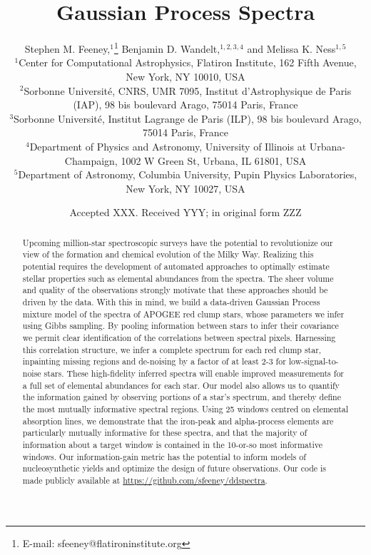 \documentclass[a4paper,fleqn,usenatbib]{mnras}
\title[Gaussian Process Spectra]{Gaussian Process Spectra}
\author[S. M. Feeney et al.]{
Stephen M. Feeney,$^{1}$\thanks{E-mail: sfeeney@flatironinstitute.org}
Benjamin D. Wandelt,$^{1,2,3,4}$
and Melissa K. Ness$^{1,5}$ 
\\
$^{1}$Center for Computational Astrophysics, Flatiron Institute, 162 Fifth Avenue, New York, NY 10010, USA\\
$^{2}$Sorbonne Universit\'e, CNRS, UMR 7095,  Institut d'Astrophysique de Paris (IAP), 98 bis boulevard Arago, 75014 Paris, France\\
$^{3}$Sorbonne Universit\'e, Institut Lagrange de Paris (ILP), 98 bis boulevard Arago, 75014 Paris, France\\
$^{4}$Department of Physics and Astronomy, University of Illinois at Urbana-Champaign, 1002 W Green St, Urbana, IL 61801, USA\\
$^{5}$Department of Astronomy, Columbia University, Pupin Physics Laboratories, New York, NY 10027, USA
}
\date{Accepted XXX. Received YYY; in original form ZZZ}
\begin{document}
\label{firstpage}
\pagerange{\pageref{firstpage}--\pageref{lastpage}}
\maketitle

\begin{abstract}
Upcoming million-star spectroscopic surveys have the potential to revolutionize our view of the formation and chemical evolution of the Milky Way. Realizing this potential requires the development of automated approaches to optimally estimate stellar properties %
such as elemental abundances from the spectra. The sheer volume and quality of the observations strongly motivate that these approaches should be driven by the data. With this in mind, we build a data-driven Gaussian Process mixture model of the spectra of APOGEE red clump stars, whose parameters we infer using Gibbs sampling. By pooling information between stars to infer their covariance we permit clear identification of the correlations between spectral pixels. Harnessing this correlation structure, we infer a complete spectrum for each red clump star, inpainting missing %
regions and de-noising by a factor of at least 2-3 for low-signal-to-noise stars. These high-fidelity inferred spectra will enable improved measurements for a full set of elemental abundances for each star. %
Our model also allows us to quantify the information gained by observing portions of a star's spectrum, and thereby define the most mutually informative spectral regions. %
Using 25 windows centred on elemental absorption lines, we demonstrate that the iron-peak and alpha-process elements are particularly mutually informative for these spectra, and that the majority of information about a target window is %
contained in the 10-or-so most informative windows. %
Our information-gain metric has the potential to inform models of nucleosynthetic yields and optimize the design of future observations. Our code is made publicly available at \href{https://github.com/sfeeney/ddspectra}{https://github.com/sfeeney/ddspectra}. 
\end{abstract}
\end{document}

